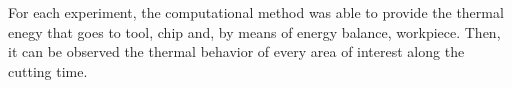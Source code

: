 	For each experiment, the computational method was able to provide the thermal enegy that goes to tool, chip and, by means of energy balance, workpiece. Then, it can be observed the thermal behavior of every area of interest along the cutting time.
	
